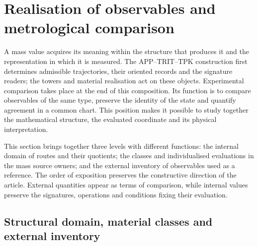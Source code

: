 
\section{Realisation of observables and metrological comparison}
\label{sec:vi-contraste-metrologico}

A mass value acquires its meaning within the structure that
produces it and the representation in which it is measured. The
APP--TRIT--TPK construction first determines admissible trajectories, their oriented
records and the signature readers; the towers and material realisation
act on these objects. Experimental comparison takes place at the end of
this composition. Its function is to compare observables of the same
type, preserve the identity of the state and quantify agreement in a
common chart. This position makes it possible to study together the mathematical
structure, the evaluated coordinate and its physical interpretation.

This section brings together three levels with different functions:
the internal domain of routes and their quotients; the classes and individualised
evaluations in the mass source owners; and the external inventory of
observables used as a reference. The order of exposition preserves the
constructive direction of the article. External quantities appear as
terms of comparison, while internal values preserve the signatures,
operations and conditions fixing their evaluation.

\subsection{Structural domain, material classes and external inventory}
\label{subsec:vi-dominios-contraste}

